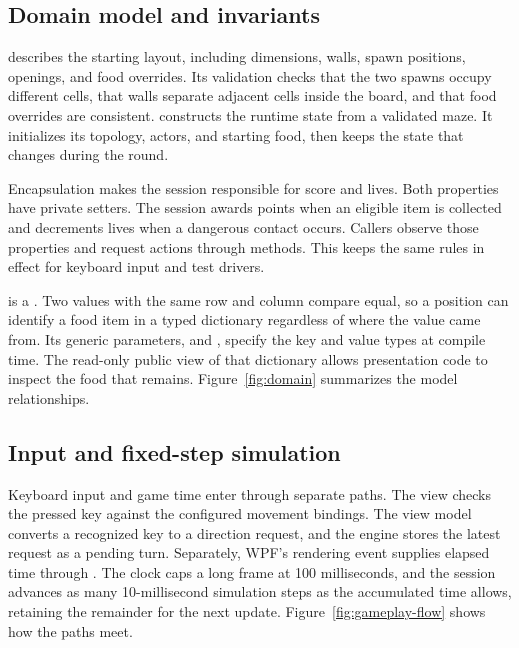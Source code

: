 \subsection{Domain model and invariants}

 describes the starting layout, including dimensions, walls, spawn positions, openings, and food overrides. Its validation checks that the two spawns occupy different cells, that walls separate adjacent cells inside the board, and that food overrides are consistent.  constructs the runtime state from a validated maze. It initializes its topology, actors, and starting food, then keeps the state that changes during the round.

Encapsulation makes the session responsible for score and lives. Both properties have private setters. The session awards points when an eligible item is collected and decrements lives when a dangerous contact occurs. Callers observe those properties and request actions through methods. This keeps the same rules in effect for keyboard input and test drivers.

 is a . Two values with the same row and column compare equal, so a position can identify a food item in a typed dictionary regardless of where the value came from. Its generic parameters,  and , specify the key and value types at compile time. The read-only public view of that dictionary allows presentation code to inspect the food that remains. Figure~\ref{fig:domain} summarizes the model relationships.


\clearpage
\subsection{Input and fixed-step simulation}

Keyboard input and game time enter through separate paths. The view checks the pressed key against the configured movement bindings. The view model converts a recognized key to a direction request, and the engine stores the latest request as a pending turn. Separately, WPF's rendering event supplies elapsed time through . The clock caps a long frame at 100 milliseconds, and the session advances as many 10-millisecond simulation steps as the accumulated time allows, retaining the remainder for the next update. Figure~\ref{fig:gameplay-flow} shows how the paths meet.

